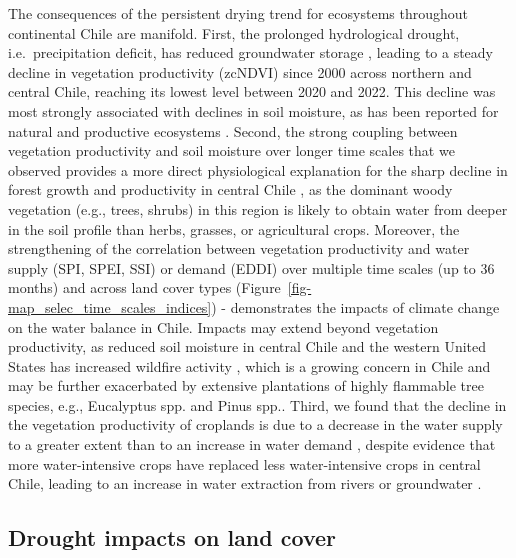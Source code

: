 \documentclass[
  sn-nature,
  numbered]{sn-jnl}
\begin{document}
The consequences of the persistent drying trend for ecosystems
throughout continental Chile are manifold. First, the prolonged
hydrological drought, i.e.~precipitation deficit, has reduced
groundwater storage \citep[SSI,][]{Taucare2024}, leading to a steady
decline in vegetation productivity (zcNDVI) since 2000 across northern
and central Chile, reaching its lowest level between 2020 and 2022. This
decline was most strongly associated with declines in soil moisture, as
has been reported for natural and productive ecosystems
\citep{Nicolai-Shaw2017, Jiang2020, Zhou2021}. Second, the strong
coupling between vegetation productivity and soil moisture over longer
time scales \citep{Bonan2008} that we observed provides a more direct
physiological explanation for the sharp decline in forest growth and
productivity in central Chile \citep[e.g.,][]{Miranda2023, Venegas2022},
as the dominant woody vegetation (e.g., trees, shrubs) in this region is
likely to obtain water from deeper in the soil profile than herbs,
grasses, or agricultural crops\citep{Oliviera2005}. Moreover, the
strengthening of the correlation between vegetation productivity and
water supply (SPI, SPEI, SSI) or demand (EDDI) over multiple time scales
(up to 36 months) and across land cover types
(Figure~\ref{fig-map_selec_time_scales_indices}) - demonstrates the
impacts of climate change on the water balance in Chile. Impacts may
extend beyond vegetation productivity, as reduced soil moisture in
central Chile and the western United States has increased wildfire
activity \citep{Holden2018, Gonzalez2018}, which is a growing concern in
Chile and may be further exacerbated by extensive plantations of highly
flammable tree species, e.g., Eucalyptus spp. and Pinus
spp.\citep{Bowman2019}. Third, we found that the decline in the
vegetation productivity of croplands is due to a decrease in the water
supply to a greater extent than to an increase in water demand
\citep{Quiring2010}, despite evidence that more water-intensive crops
have replaced less water-intensive crops in central Chile, leading to an
increase in water extraction from rivers or groundwater
\citep{Munoz2020, Duran2020}.

\subsection{Drought impacts on land
cover}\label{drought-impacts-on-land-cover}
\end{document}
